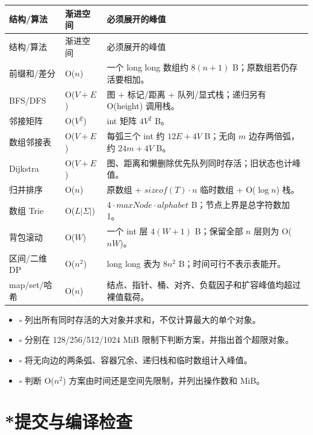 \documentclass[a4paper,11pt]{article}
\begin{document}
\begin{longtable}{L{3.3cm} L{4.0cm} L{8.0cm}}
\toprule
结构/算法 & 渐进空间 & 必须展开的峰值 \\
\midrule
\endfirsthead
\toprule
结构/算法 & 渐进空间 & 必须展开的峰值 \\
\midrule
\endhead
\endfoot
\bottomrule
\endlastfoot
前缀和/差分 & O($n$) & 一个 long long 数组约 $8(n+1)$ B；原数组若仍存活要相加。 \\[1.5mm]
BFS/DFS & O($V+E$) & 图 + 标记/距离 + 队列/显式栈；递归另有 O(height) 调用栈。 \\[1.5mm]
邻接矩阵 & O($V^2$) & int 矩阵 $4V^2$ B。 \\[1.5mm]
数组邻接表 & O($V+E$) & 每弧三个 int 约 $12E+4V$ B；无向 $m$ 边存两倍弧，约 $24m+4V$ B。 \\[1.5mm]
Dijkstra & O($V+E$) & 图、距离和懒删除优先队列同时存活；旧状态也计峰值。 \\[1.5mm]
归并排序 & O($n$) & 原数组 + $sizeof(T)\cdot n$ 临时数组 + O($\log n$) 栈。 \\[1.5mm]
数组 Trie & O($L|\Sigma|$) & $4\cdot maxNode\cdot alphabet$ B；节点上界是总字符数加 1。 \\[1.5mm]
背包滚动 & O($W$) & 一个 int 层 $4(W+1)$ B；保留全部 $n$ 层则为 O($nW$)。 \\[1.5mm]
区间/二维 DP & O($n^2$) & long long 表为 $8n^2$ B；时间可行不表示表能开。 \\[1.5mm]
map/set/哈希 & O($n$) & 结点、指针、桶、对齐、负载因子和扩容峰值均超过裸值载荷。 \\
\end{longtable}

\begin{itemize}
  \item $\square$ 列出所有同时存活的大对象并求和，不仅计算最大的单个对象。
  \item $\square$ 分别在 128/256/512/1024 MiB 限制下判断方案，并指出首个超限对象。
  \item $\square$ 将无向边的两条弧、容器冗余、递归栈和临时数组计入峰值。
  \item $\square$ 判断 O($n^2$) 方案由时间还是空间先限制，并列出操作数和 MiB。
\end{itemize}

\newpage
\section{*提交与编译检查}
\end{document}
